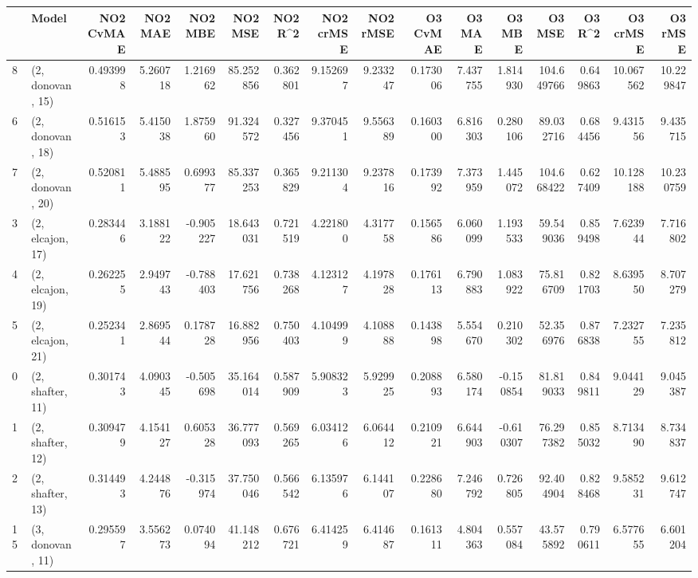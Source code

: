 \begin{tabular}{llrrrrrrrrrrrrrr}
\toprule
{} &             Model &  NO2 CvMAE &   NO2 MAE &   NO2 MBE &    NO2 MSE &   NO2 R\textasciicircum2 &  NO2 crMSE &  NO2 rMSE &  O3 CvMAE &     O3 MAE &    O3 MBE &      O3 MSE &    O3 R\textasciicircum2 &   O3 crMSE &    O3 rMSE \\
\midrule
8  &  (2, donovan, 15) &   0.493998 &  5.260718 &  1.216962 &  85.252856 &  0.362801 &   9.152697 &  9.233247 &  0.173006 &   7.437755 &  1.814930 &  104.649766 &  0.649863 &  10.067562 &  10.229847 \\
6  &  (2, donovan, 18) &   0.516153 &  5.415038 &  1.875960 &  91.324572 &  0.327456 &   9.370451 &  9.556389 &  0.160300 &   6.816303 &  0.280106 &   89.032716 &  0.684456 &   9.431556 &   9.435715 \\
7  &  (2, donovan, 20) &   0.520811 &  5.488595 &  0.699377 &  85.337253 &  0.365829 &   9.211304 &  9.237816 &  0.173992 &   7.373959 &  1.445072 &  104.668422 &  0.627409 &  10.128188 &  10.230759 \\
3  &  (2, elcajon, 17) &   0.283446 &  3.188122 & -0.905227 &  18.643031 &  0.721519 &   4.221800 &  4.317758 &  0.156586 &   6.060099 &  1.193533 &   59.549036 &  0.859498 &   7.623944 &   7.716802 \\
4  &  (2, elcajon, 19) &   0.262255 &  2.949743 & -0.788403 &  17.621756 &  0.738268 &   4.123127 &  4.197828 &  0.176113 &   6.790883 &  1.083922 &   75.816709 &  0.821703 &   8.639550 &   8.707279 \\
5  &  (2, elcajon, 21) &   0.252341 &  2.869544 &  0.178728 &  16.882956 &  0.750403 &   4.104999 &  4.108888 &  0.143898 &   5.554670 &  0.210302 &   52.356976 &  0.876838 &   7.232755 &   7.235812 \\
0  &  (2, shafter, 11) &   0.301743 &  4.090345 & -0.505698 &  35.164014 &  0.587909 &   5.908323 &  5.929925 &  0.208893 &   6.580174 & -0.150854 &   81.819033 &  0.849811 &   9.044129 &   9.045387 \\
1  &  (2, shafter, 12) &   0.309479 &  4.154127 &  0.605328 &  36.777093 &  0.569265 &   6.034126 &  6.064412 &  0.210921 &   6.644903 & -0.610307 &   76.297382 &  0.855032 &   8.713490 &   8.734837 \\
2  &  (2, shafter, 13) &   0.314493 &  4.244876 & -0.315974 &  37.750046 &  0.566542 &   6.135976 &  6.144107 &  0.228680 &   7.246792 &  0.726805 &   92.404904 &  0.828468 &   9.585231 &   9.612747 \\
15 &  (3, donovan, 11) &   0.295597 &  3.556273 &  0.074094 &  41.148212 &  0.676721 &   6.414259 &  6.414687 &  0.161311 &   4.804363 &  0.557084 &   43.575892 &  0.790611 &   6.577655 &   6.601204 \\

\end{tabular}
